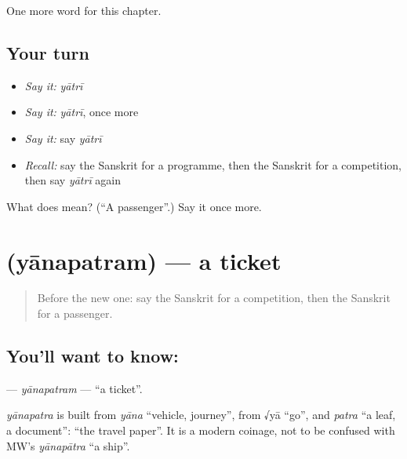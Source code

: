 \begin{grammarlens}[title={What you've built}]
One more word for this chapter.
\end{grammarlens}

\subsection*{Your turn}
\begin{itemize}
\raggedright
  \item \emph{Say it:} \emph{yātrī}
  \item \emph{Say it:} \emph{yātrī}, once more
  \item \emph{Say it:} say \emph{yātrī}
  \item \emph{Recall:} say the Sanskrit for a programme, then the Sanskrit for a competition, then say \emph{yātrī} again
\end{itemize}

\begin{tcolorbox}[breakable,colback=teal!4,colframe=teal!35!black,title={Before you move on}]
What does  mean? (\textquotedblleft{}A passenger\textquotedblright{}.) Say it once more.
\end{tcolorbox}
\section[\texorpdfstring{\sk{यानपत्रम्} (yānapatram)}{यानपत्रम् (yānapatram)}]{ (yānapatram) — a ticket}

\label{lesson:SA-C172-yanapatram}



\begin{quote}
Before the new one: say the Sanskrit for a competition, then the Sanskrit for a passenger.
\end{quote}

\subsection*{You'll want to know: }
\textbf{} — \emph{yānapatram} — \textquotedblleft{}a ticket\textquotedblright{}.

\begin{cousinweb}
\emph{yānapatra} is built from \emph{yāna} \textquotedblleft{}vehicle, journey\textquotedblright{}, from √yā \textquotedblleft{}go\textquotedblright{}, and \emph{patra} \textquotedblleft{}a leaf, a document\textquotedblright{}: \textquotedblleft{}the travel paper\textquotedblright{}. It is a modern coinage, not to be confused with MW's \emph{yānapātra} \textquotedblleft{}a ship\textquotedblright{}.
\end{cousinweb}

